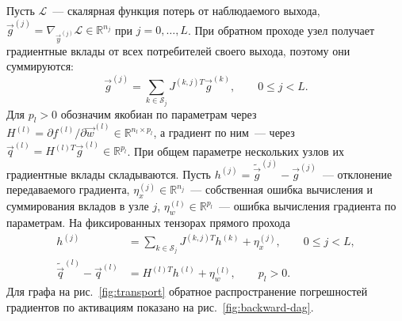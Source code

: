 Пусть $\mathcal{L}$~--- скалярная функция потерь от наблюдаемого выхода,
$\Vec{g}^{(j)}=\nabla_{\Vec{y}^{(j)}}\mathcal{L}\in\mathbb{R}^{n_j}$
при $j=0,\ldots,L$.
При обратном проходе узел получает градиентные вклады от всех
потребителей своего выхода, поэтому они суммируются:
\[
    \Vec{g}^{(j)}=\sum_{k\in\mathcal{S}_j}J^{(k,j)T}\Vec{g}^{(k)},
    \qquad 0\le j<L.
\]
Для $p_l>0$ обозначим якобиан по параметрам через
$H^{(l)}=\partial f^{(l)}/\partial\Vec{w}^{(l)}
\in\mathbb{R}^{n_l\times p_l}$,
а градиент по ним~--- через
$\Vec{q}^{(l)}=H^{(l)T}\Vec{g}^{(l)}\in\mathbb{R}^{p_l}$.
При общем параметре нескольких узлов их градиентные вклады складываются.
Пусть $h^{(j)}=\widetilde{\Vec{g}}^{(j)}-\Vec{g}^{(j)}$~--- отклонение
передаваемого градиента,
$\eta_x^{(j)}\in\mathbb{R}^{n_j}$~--- собственная ошибка вычисления
и суммирования вкладов в узле $j$,
$\eta_w^{(l)}\in\mathbb{R}^{p_l}$~--- ошибка вычисления градиента
по параметрам. На фиксированных тензорах прямого прохода
\begin{equation}
    \label{eq:bwd}
    \begin{aligned}
        h^{(j)}&=\sum_{k\in\mathcal{S}_j}J^{(k,j)T}h^{(k)}
            +\eta_x^{(j)},\qquad 0\le j<L,\\
        \widetilde{\Vec{q}}^{(l)}-\Vec{q}^{(l)}
            &=H^{(l)T}h^{(l)}+\eta_w^{(l)},\qquad p_l>0.
    \end{aligned}
\end{equation}
Для графа на рис.~\ref{fig:transport} обратное распространение
погрешностей градиентов по активациям показано на рис.~\ref{fig:backward-dag}.

